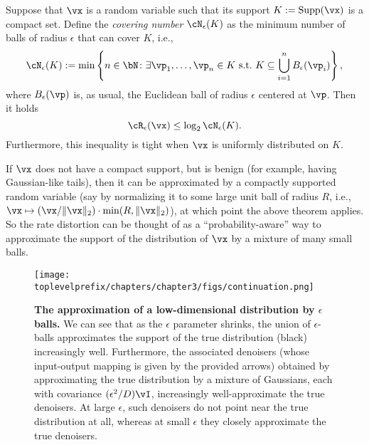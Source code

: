 \documentclass[../../book-main.tex]{subfiles}
\begin{document}
\begin{proposition}\label{prop:covering-number-rate-distortion}
	Suppose that \(\vx\) is a random variable such that its support \(K := \Supp(\vx)\) is a compact set. Define the \textit{covering number} \(\cN_{\epsilon}(K)\) as the minimum number of balls of radius \(\epsilon\) that can cover \(K\), i.e.,
	\begin{equation}
		\cN_{\epsilon}(K) := \min\left\{n \in \bN \colon \exists \vp_{1}, \dots, \vp_{n} \in K\ \text{s.t.}\ K \subseteq \bigcup_{i = 1}^{n}B_{\epsilon}(\vp_{i})\right\},
	\end{equation}
	where \(B_{\epsilon}(\vp)\) is, as usual, the Euclidean ball of radius \(\epsilon\) centered at \(\vp\).
	Then it holds 
	\begin{equation}
		\cR_{\epsilon}(\vx) \leq \log_{2} \cN_{\epsilon}(K).
	\end{equation}
	Furthermore, this inequality is tight when \(\vx\) is uniformly distributed on \(K\).
\end{proposition}
If \(\vx\) does not have a compact support, but is benign (for example, having Gaussian-like tails), then it can be approximated by a compactly supported random variable (say by normalizing it to some large unit ball of radius \(R\), i.e., \(\vx \mapsto (\vx/\norm{\vx}_{2}) \cdot \min(R, \|\vx\|_{2})\)), at which point the above theorem applies. So the rate distortion can be thought of as a ``probability-aware'' way to approximate the support of the distribution of \(\vx\) by a mixture of many small balls.

\begin{figure}
	\centering 
	\texttt{[image: \\toplevelprefix/chapters/chapter3/figs/continuation.png]}
	\caption{\small\textbf{The approximation of a low-dimensional distribution by \(\epsilon\) balls.} We can see that as the \(\epsilon\) parameter shrinks, the union of \(\epsilon\)-balls approximates the support of the true distribution (black) increasingly well. Furthermore, the associated denoisers (whose input-output mapping is given by the provided arrows) obtained by approximating the true distribution by a mixture of Gaussians, each with covariance \((\epsilon^{2}/D)\vI\), increasingly well-approximate the true denoisers. At large \(\epsilon\), such denoisers do not point near the true distribution at all, whereas at small \(\epsilon\) they closely approximate the true denoisers.}
	\label{fig:continuation}
\end{figure}
\end{document}
